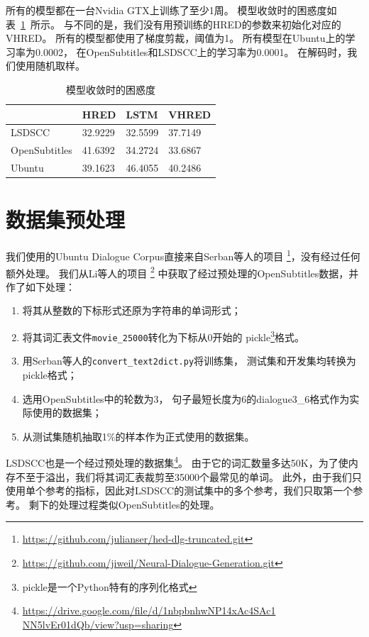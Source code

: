 所有的模型都在一台Nvidia GTX上训练了至少1周。
模型收敛时的困惑度如表~\ref{tab:converged_perplexity}~所示。
与不同的是，我们没有用预训练的HRED的参数来初始化对应的VHRED。
所有的模型都使用了梯度剪裁，阈值为1。
所有模型在Ubuntu上的学习率为0.0002，
在OpenSubtitles和LSDSCC上的学习率为0.0001。
在解码时，我们使用随机取样。
\begin{table}
    \centering
    \caption{模型收敛时的困惑度}
    \label{tab:converged_perplexity}
    \begin{tabular}{llll}
        \toprule
        \midrule
        & HRED & LSTM & VHRED \\
        \midrule
        LSDSCC & 32.9229 & 32.5599 & 37.7149 \\
        OpenSubtitles & 41.6392 & 34.2724 & 33.6867 \\
        Ubuntu & 39.1623 & 46.4055 & 40.2486 \\
        \bottomrule
    \end{tabular}
\end{table}

\section{数据集预处理}
\label{sec:dataset_proprecessing}
我们使用的Ubuntu Dialogue Corpus直接来自Serban等人的项目
\footnote{\url{https://github.com/julianser/hed-dlg-truncated.git}}，没有经过任何额外处理。
我们从Li等人的项目
\footnote{\url{https://github.com/jiweil/Neural-Dialogue-Generation.git}}
中获取了经过预处理的OpenSubtitles数据，并作了如下处理：
\begin{enumerate}
    \item 将其从整数的下标形式还原为字符串的单词形式；
    \item 将其词汇表文件\texttt{movie\_25000}转化为下标从0开始的 pickle\footnote{pickle是一个Python特有的序列化格式}格式。
    \item 用Serban等人的\texttt{convert\_text2dict.py}将训练集，
    测试集和开发集均转换为pickle格式；
    \item 选用OpenSubtitles中的轮数为3， 句子最短长度为6的dialogue3\_6格式作为实际使用的数据集；
    \item 从测试集随机抽取1\%的样本作为正式使用的数据集。
\end{enumerate}

LSDSCC也是一个经过预处理的数据集\footnote{\url{https://drive.google.com/file/d/1nbpbnhwNP14xAc4SAc1 NN5lvEr01dQb/view?usp=sharing}}。
由于它的词汇数量多达50K，为了使内存不至于溢出，我们将其词汇表裁剪至35000个最常见的单词。
此外，由于我们只使用单个参考的指标，因此对LSDSCC的测试集中的多个参考，我们只取第一个参考。
剩下的处理过程类似OpenSubtitles的处理。

